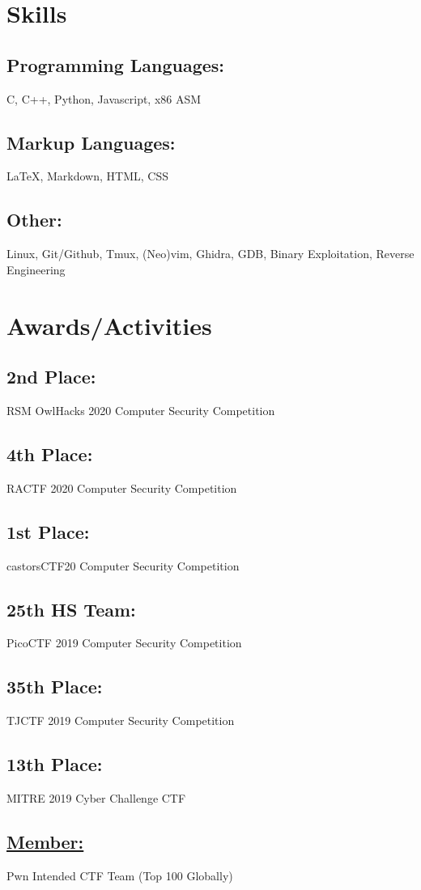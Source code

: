 \documentclass{article}
\begin{document}
\section{Skills}
\subsection{Programming Languages:}
C, C++, Python, Javascript, x86 ASM
\subsection{Markup Languages:}
{\LaTeX}, Markdown, HTML, CSS
\subsection{Other:}
Linux, Git/Github, Tmux, (Neo)vim, Ghidra, GDB, Binary Exploitation, Reverse Engineering

\section{Awards/Activities}
\subsection{2nd Place: } RSM OwlHacks 2020 Computer Security Competition
\subsection{4th Place: } RACTF 2020 Computer Security Competition
\subsection{1st Place: } castorsCTF20 Computer Security Competition
\subsection{25th HS Team: } PicoCTF 2019 Computer Security Competition
\subsection{35th Place: } TJCTF 2019 Computer Security Competition
\subsection{13th Place: } MITRE 2019 Cyber Challenge CTF
\subsection{\href{https://ctftime.org/user/66839}{Member: }} Pwn Intended CTF Team (Top 100 Globally)
\end{document}
